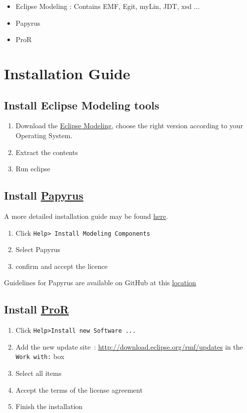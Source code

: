\documentclass{openetcs_report}
\begin{document}
\begin{itemize}
\item Eclipse Modeling : Contains EMF, Egit, myLin, JDT, xsd ... 
\item Papyrus
\item ProR
\end{itemize}


\section{Installation Guide}
\subsection{Install Eclipse Modeling tools}
\begin{enumerate}
\item Download the
  \href{http://www.eclipse.org/downloads/packages/eclipse-modeling-tools/keplerr}{Eclipse
    Modeling}, choose the right version according to your Operating System.
\item Extract the contents 
\item Run eclipse
\end{enumerate}


 \subsection{Install \href{http://www.eclipse.org/papyrus/}{Papyrus}}
A more detailed installation guide may be found
\href{https://github.com/openETCS/toolchain/blob/master/ToolDescription/Papyrus/HowTo_install_papyrus_V1.2.0.pdf}{here}.
\begin{enumerate}
\item Click \verb+Help> Install Modeling Components+
\item Select Papyrus
\item confirm and accept the licence
\end{enumerate}


Guidelines for Papyrus are available on GitHub at this
\href{https://github.com/openETCS/model-evaluation/tree/master/model/Papyrus-CEA-All4tec/papyrus_guidelines}{location}

\subsection{Install \href{http://www.eclipse.org/rmf/pror/}{ProR}}
\begin{enumerate}
\item Click \verb+Help>Install new Software ...+
\item Add the new update site~:
\url{http://download.eclipse.org/rmf/updates} 
in the \verb+Work with:+ box
\item Select all items
\item Accept the terms of the license agreement
\item Finish the installation
\end{enumerate}
\end{document}
